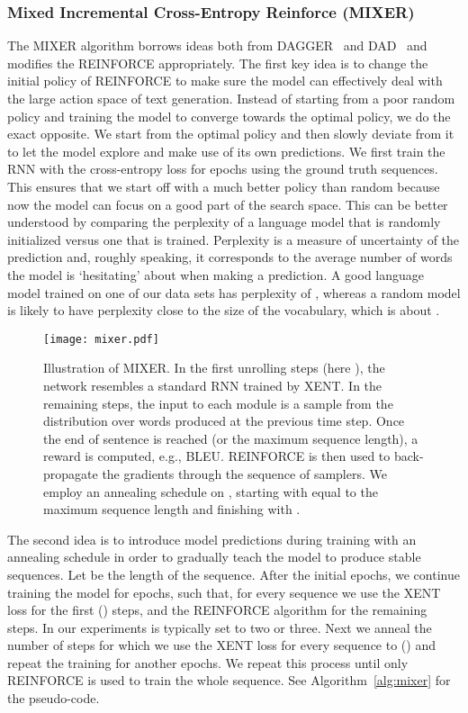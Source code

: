 \documentclass{article} \usepackage{iclr2016_conference,times}
\begin{document}
\subsubsection{Mixed Incremental Cross-Entropy Reinforce (MIXER)} \label{model-mixer}
The MIXER algorithm borrows ideas both from DAGGER~\citep{dagger} and 
DAD~\citep{dad, sbengio-nips2015} and modifies the REINFORCE appropriately. 
The first key idea is to change the initial policy of REINFORCE to make sure
the model can effectively deal with the large action space of text generation.
Instead of starting from a poor random policy and training the model to converge 
towards the optimal policy, we do the exact opposite. We start from the optimal 
policy and then slowly deviate from it to let the model explore and make use 
of its own predictions.
We first train the RNN with the cross-entropy loss for
 epochs using the ground truth sequences.
This ensures that we start off with a much better policy than random 
because now the model can focus on a good part of the search space.
This can be better understood by comparing the perplexity of a language model 
that is randomly initialized versus one that is trained. Perplexity is a measure of uncertainty of the prediction and, roughly speaking, it corresponds to the average number of words the model is `hesitating' about when making a prediction. A good language model trained on one of our data sets has perplexity of , whereas a random model is likely to have
perplexity close to the size of the vocabulary, which is about .
\begin{figure}[!t]
\begin{center}
\texttt{[image: mixer.pdf]}
\end{center}
\caption{Illustration of MIXER. In the first  unrolling steps (here ),
  the network resembles a standard RNN trained by XENT. In the
  remaining steps, the input to each module is a sample from the
  distribution over words produced at the previous time step. Once the
  end of sentence is reached (or the maximum sequence length), a
  reward is computed, e.g., BLEU. REINFORCE is then
  used to back-propagate the gradients through the sequence of
  samplers. We employ an annealing schedule on , starting with 
   equal to the maximum sequence length  and finishing with .
 }
\label{fig:mixer}
\end{figure}

The second idea is to introduce model predictions during training 
with an annealing schedule in order to gradually teach the model to produce stable sequences. 
Let  be the length of the sequence.
After the initial  epochs, we continue training the 
model for  epochs, such that, for every sequence 
we use the XENT loss for the first () steps, and the REINFORCE algorithm 
for the remaining  steps.
In our experiments  is typically set to two or three. 
Next we anneal the number of steps for which we use the XENT loss for every sequence to  
() and repeat the training for another  epochs. 
We repeat this process until only REINFORCE is used to train the whole sequence.
See Algorithm~\ref{alg:mixer} for the pseudo-code. 
\end{document}

